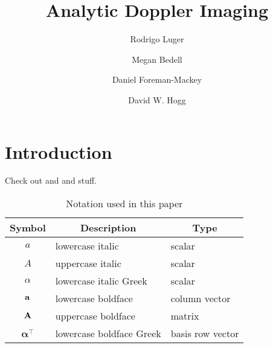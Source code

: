 \documentclass[modern]{aastex62}
\begin{document}
\title{Analytic Doppler Imaging}

\author[0000-0002-0296-3826]{Rodrigo Luger}
%
\author{Megan Bedell}
%
\author{Daniel Foreman-Mackey}
%
\author{David W. Hogg}

%
\section{Introduction}
%
Check out \citet{Luger2019} and \citet{Bedell2019} and stuff.

%
\begin{center}
    \begin{longtable}{cll}
    \caption{Notation used in this paper} 
    \label{tab:notation} \\
    \toprule
    \multicolumn{1}{c}{\textbf{Symbol}} &
    \multicolumn{1}{c}{\textbf{Description}} &
    \multicolumn{1}{c}{\textbf{Type}} \\
    \toprule
    \endhead
    \endfoot
    \endlastfoot
    $a$                             & lowercase italic & scalar\\
    $A$                             & uppercase italic & scalar\\
    $\alpha$                        & lowercase italic Greek & scalar\\
    ${\mathbf{a}}$                      & lowercase boldface & column vector\\
    ${\mathbf{A}}$                      & uppercase boldface & matrix\\
    $\boldsymbol{\alpha}^\top$      & lowercase boldface Greek & basis row vector
\end{longtable}
\end{center}

%
\end{document}
